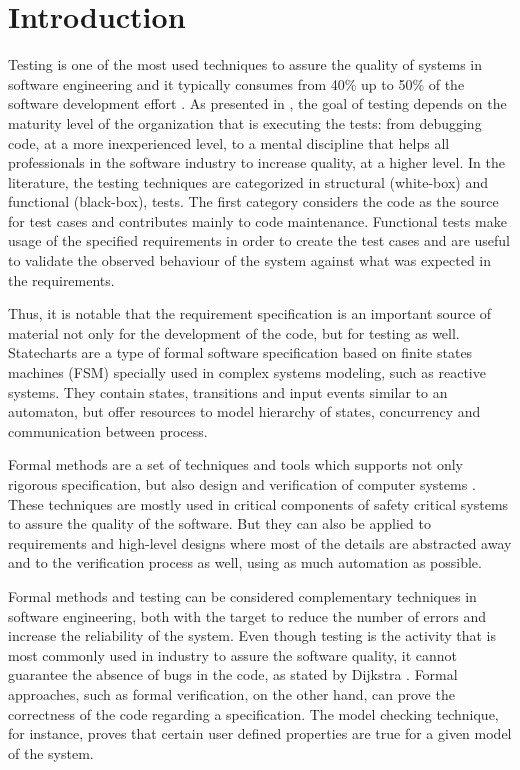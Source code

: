 \chapter{Introduction}
\label{cap:introducao}

Testing is one of the most used techniques to assure the quality of systems in software engineering and it typically consumes from 40\% up to 50\% of the software development effort \cite{Luo}. As presented in \cite{Ammann:08}, the goal of testing depends on the maturity level of the organization that is executing the tests: from debugging code, at a more inexperienced level, to a mental discipline that helps all professionals in the software industry to increase quality, at a higher level. In the literature, the testing techniques are categorized in structural (white-box) and functional (black-box), tests. The first category considers the code as the source for test cases and contributes mainly to code maintenance. Functional tests make usage of the specified requirements in order to create the test cases and are useful to validate the observed behaviour of the system against what was expected in the requirements.

Thus, it is notable that the requirement specification is an important source of material not only for the development of the code, but for testing as well. Statecharts are a type of formal software specification based on finite states machines (FSM) specially used in complex systems modeling, such as reactive systems\cite{harel87:semantics_statecharts}. They contain states, transitions and input events similar to an automaton, but offer resources to model hierarchy of states, concurrency and communication between process.


Formal methods are a set of techniques and tools which supports not only rigorous specification, but also design and verification of computer systems \cite{FMEurope}. These techniques are mostly used in critical components of safety critical systems to assure the quality of the software. But they can also be applied to requirements and high-level designs where most of the details are abstracted away and to the verification process as well, using as much automation as possible\cite{NASAlangley}.


Formal methods and testing can be considered complementary techniques in software engineering, both with the target to reduce the number of errors and increase the reliability of the system\cite{fortest}. Even though testing is the activity that is most commonly used in industry to assure the software quality, it cannot guarantee the absence of bugs in the code, as stated by Dijkstra \cite{dijkstra}. Formal approaches, such as formal verification, on the other hand, can prove the correctness of the code regarding a specification. The model checking technique, for instance, proves that certain user defined properties are true for a given model of the system.


